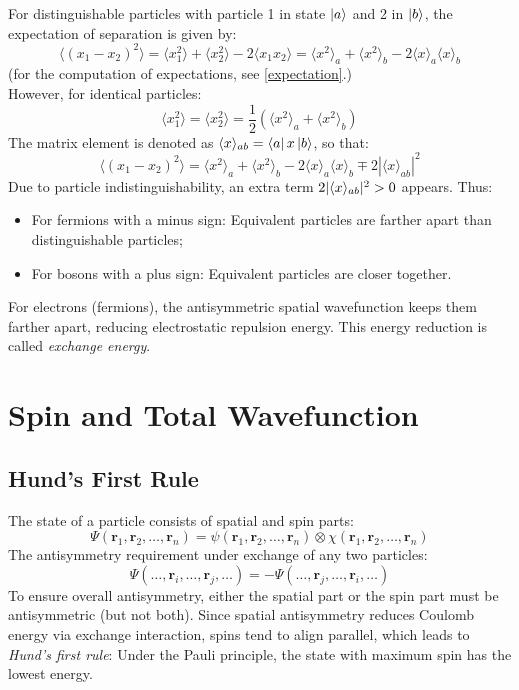 For distinguishable particles with particle 1 in state $\ket{a}$ and 2 in $\ket{b}$, the expectation of separation is given by:
\[
    \langle (x_1 - x_2)^2 \rangle = \langle x_1^2 \rangle + \langle x_2^2 \rangle - 2\langle x_1 x_2 \rangle = \langle x^2 \rangle_a + \langle x^2 \rangle_b - 2\langle x \rangle_a \langle x \rangle_b
\]
(for the computation of expectations, see \ref{expectation}.)\\
However, for identical particles:
\[
\langle x_1^2 \rangle = \langle x_2^2 \rangle = \frac{1}{2}(\langle x^2 \rangle_a + \langle x^2 \rangle_b)
\]
The matrix element is denoted as $\langle x \rangle_{ab} = \bra{a}x\ket{b}$, so that:
\[
    \langle (x_1 - x_2)^2 \rangle = \langle x^2 \rangle_a + \langle x^2 \rangle_b - 2\langle x \rangle_a \langle x \rangle_b \mp 2|\langle x \rangle_{ab}|^2
\]
Due to particle indistinguishability, an extra term $2|\langle x \rangle_{ab}|^2 > 0$ appears. Thus:
\begin{itemize}
    \item For fermions with a minus sign: Equivalent particles are farther apart than distinguishable particles;
    \item For bosons with a plus sign: Equivalent particles are closer together.
\end{itemize}
For electrons (fermions), the antisymmetric spatial wavefunction keeps them farther apart, reducing electrostatic repulsion energy. This energy reduction is called \emph{exchange energy}.


\section{Spin and Total Wavefunction}
\subsection{Hund's First Rule}

The state of a particle consists of spatial and spin parts:
\[
    \Psi(\mathbf{r}_1, \mathbf{r}_2, \ldots, \mathbf{r}_n) = \psi(\mathbf{r}_1, \mathbf{r}_2, \ldots, \mathbf{r}_n) \otimes \chi(\mathbf{r}_1, \mathbf{r}_2, \ldots, \mathbf{r}_n)
\]
The antisymmetry requirement under exchange of any two particles:
\[
    \Psi(\ldots, \mathbf{r}_i, \ldots, \mathbf{r}_j, \ldots) = -\Psi(\ldots, \mathbf{r}_j, \ldots, \mathbf{r}_i, \ldots)
\]
To ensure overall antisymmetry, either the spatial part or the spin part must be antisymmetric (but not both). Since spatial antisymmetry reduces Coulomb energy via exchange interaction, spins tend to align parallel, which leads to \emph{Hund's first rule}: Under the Pauli principle, the state with maximum spin has the lowest energy.

